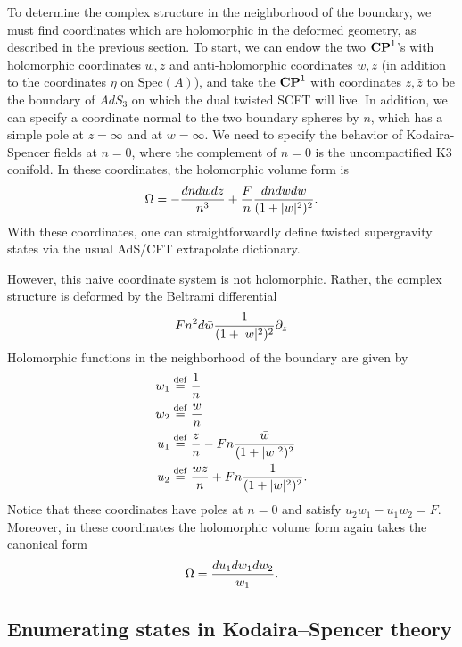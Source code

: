 \documentclass[../main.tex]{subfiles}
\begin{document}
To determine the complex structure in the neighborhood of the boundary, we must find coordinates which are holomorphic in the deformed geometry, as described in the previous section. To start, we can endow the two $\mathbf{CP}^1$'s with holomorphic coordinates $w, z$ and anti-holomorphic coordinates $\bar{w}, \bar{z}$ (in addition to the coordinates $\eta$ on $\textrm{Spec}(A)$), and take the $\mathbf{CP}^1$ with coordinates $z, \bar{z}$ to be the boundary of $AdS_3$ on which the dual twisted SCFT will live. In addition, we can specify a coordinate normal to the two boundary spheres by $n$, which has a simple pole at $z=\infty$ and at $w = \infty$. We need to specify the behavior of Kodaira-Spencer fields at $n=0$, where the complement of $n=0$ is the uncompactified K3 conifold. In these coordinates, the holomorphic volume form is 
\begin{equation}
\Omega = -{dn dw dz \over n^3} + {F \over n}{dn dw d\bar{w} \over (1 + |w|^2)^2}.
\end{equation} With these coordinates, one can straightforwardly define twisted supergravity states via the usual AdS/CFT extrapolate dictionary. 

However, this naive coordinate system is not holomorphic. Rather, the complex structure is deformed by the Beltrami differential
\begin{equation}
F n^2 d\bar{w}{1 \over (1 + |w|^2)^2}\partial_z
\end{equation}
Holomorphic functions in the neighborhood of the boundary are given by 
\begin{align}
w_1&\overset{\rm def}{=} {1 \over n} \\
w_2&\overset{\rm def}{=}{w \over n} \\
u_1&\overset{\rm def}{=}{z \over n} - F n {\bar{w} \over (1 + |w|^2)^2} \\
u_2&\overset{\rm def}{=}{w z \over n} + F n {1 \over (1 + |w|^2)^2}.
\end{align}
Notice that these coordinates have poles at $n=0$ and satisfy $u_2 w_1 - u_1 w_2 = F$. Moreover, in these coordinates the holomorphic volume form again takes the canonical form
\begin{equation}
\Omega = {du_1 dw_1 dw_2 \over w_1}.
\end{equation}




\subsection{Enumerating states in Kodaira--Spencer theory}
\end{document}
